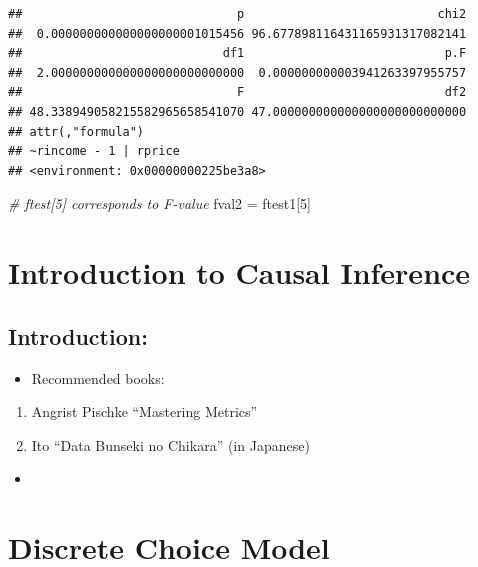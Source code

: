 \documentclass[]{book}
\newenvironment{Shaded}{\begin{snugshade}}{\end{snugshade}}
\newcommand{\DecValTok}[1]{\textcolor[rgb]{0.00,0.00,0.81}{#1}}
\newcommand{\StringTok}[1]{\textcolor[rgb]{0.31,0.60,0.02}{#1}}
\newcommand{\CommentTok}[1]{\textcolor[rgb]{0.56,0.35,0.01}{\textit{#1}}}
\newcommand{\NormalTok}[1]{#1}
\providecommand{\tightlist}{%
  \setlength{\itemsep}{0pt}\setlength{\parskip}{0pt}}
\begin{document}
\begin{verbatim}
##                              p                           chi2 
##  0.000000000000000000001015456 96.677898116431165931317082141 
##                            df1                            p.F 
##  2.000000000000000000000000000  0.000000000003941263397955757 
##                              F                            df2 
## 48.338949058215582965658541070 47.000000000000000000000000000 
## attr(,"formula")
## ~rincome - 1 | rprice
## <environment: 0x00000000225be3a8>
\end{verbatim}

\begin{Shaded}
\begin{Highlighting}[]
\CommentTok{# ftest[5] corresponds to F-value}
\NormalTok{fval2 =}\StringTok{ }\NormalTok{ftest1[}\DecValTok{5}\NormalTok{]}
\end{Highlighting}
\end{Shaded}

\chapter{Introduction to Causal
Inference}\label{introduction-to-causal-inference}

\section{Introduction:}\label{introduction-3}

\begin{itemize}
\tightlist
\item
  Recommended books:
\end{itemize}

\begin{enumerate}
\def\labelenumi{\arabic{enumi}.}
\tightlist
\item
  Angrist Pischke ``Mastering Metrics''
\item
  Ito ``Data Bunseki no Chikara'' (in Japanese)
\end{enumerate}

\begin{itemize}
\item
\end{itemize}

\chapter{Discrete Choice Model}\label{discrete-choice-model}
\end{document}
